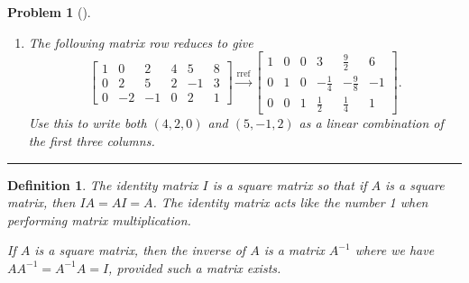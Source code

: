 \documentclass[letterpaper,oneside]{book}%
\theoremstyle{plain}
\theoremstyle{box}
\newtheorem{definition}[theorem]{Definition}
\theoremstyle{problem}
\newtheorem{problemnum}{Problem}[chapter]
\newenvironment{problem}[1][]{\begin{problemnum}[#1]}{\end{problemnum}\nopagebreak\hrule\bigskip}
\newcommand{\nvec}[1]{\begin{matrix} #1 \end{matrix}}
\begin{document}
\begin{problem}
\begin{enumerate}
$\begin{bmatrix}
\nvec{2\\1}&
\nvec{-1\\1}&
\vec v
\end{bmatrix}
$, ask yourself how you could use the larger matrix to answer this.]
\item The following matrix row reduces to give
$$\begin{bmatrix}
1 & 0 & 2 & 4 & 5 & 8 \\
0 & 2 & 5 & 2 & -1 & 3 \\
0 & -2 & -1 & 0 & 2 & 1
\end{bmatrix}
\xrightarrow{\text{rref}}
\begin{bmatrix}
1 & 0 & 0 & 3 & \frac{9}{2} & 6 \\
0 & 1 & 0 & -\frac{1}{4} & -\frac{9}{8} & -1 \\
0 & 0 & 1 & \frac{1}{2} & \frac{1}{4} & 1 
\end{bmatrix}
.$$
Use this to write both $(4,2,0)$ and $(5,-1,2)$ as a linear combination of the first three columns.
\end{enumerate}
 
\end{problem}

\begin{definition}
 The identity matrix $I$ is a square matrix so that if $A$ is a square matrix, then $IA=AI=A$. The identity matrix acts like the number 1 when performing matrix multiplication.

 If $A$ is a square matrix, then the inverse of $A$ is a matrix $A^{-1}$ where we have $AA^{-1}=A^{-1}A=I$, provided such a matrix exists.
\end{definition}
\end{document}
